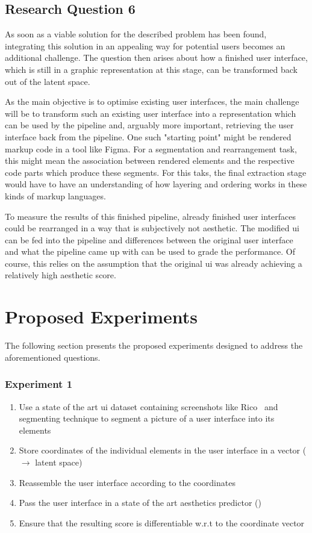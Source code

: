 \documentclass[10pt,a4paper]{scrartcl} %
\begin{document}
\subsection{Research Question 6}
As soon as a viable solution for the described problem has been found, integrating this solution in an appealing way for potential users becomes an additional challenge. The question then arises about how a finished user interface, which is still in a graphic representation at this stage, can be transformed back out of the latent space.

As the main objective is to optimise existing user interfaces, the main challenge will be to transform such an existing user interface into a representation which can be used by the pipeline and, arguably more important, retrieving the user interface back from the pipeline. One such "starting point" might be rendered markup code in a tool like Figma. For a segmentation and rearrangement task, this might mean the association between rendered elements and the respective code parts which produce these segments. For this taks, the final extraction stage would have to have an understanding of how layering and ordering works in these kinds of markup languages.

To measure the results of this finished pipeline, already finished user interfaces could be rearranged in a way that is subjectively not aesthetic. The modified \ac{ui} can be fed into the pipeline and differences between the original user interface and what the pipeline came up with can be used to grade the performance. Of course, this relies on the assumption that the original \ac{ui} was already achieving a relatively high aesthetic score.

\section{Proposed Experiments}
The following section presents the proposed experiments designed to address the aforementioned questions. 
\subsubsection{Experiment 1}
\begin{enumerate}
    \item Use a state of the art \ac{ui} dataset containing screenshots like Rico~\cite{10.1145/3126594.3126651} and segmenting technique to segment a picture of a user interface into its elements
    \item Store coordinates of the individual elements in the user interface in a vector ($\to$ latent space)
    \item Reassemble the user interface according to the coordinates
    \item Pass the user interface in a state of the art aesthetics predictor (\cite{Leiva2023})
    \item Ensure that the resulting score is differentiable w.r.t to the coordinate vector
\end{enumerate}
\end{document}

